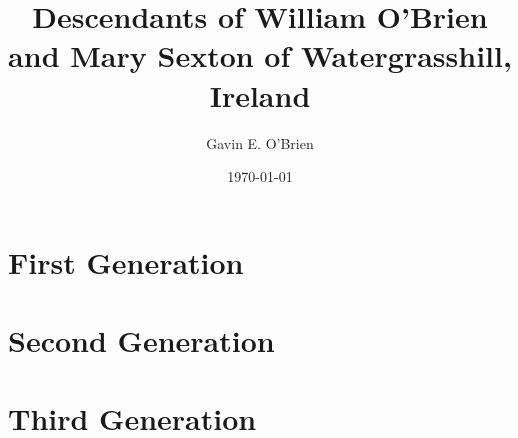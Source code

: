 \documentclass[oneside,letterpaper,12pt]{memoir}
\begin{document}
\author{Gavin E. O'Brien}
\title{Descendants of William O'Brien and Mary Sexton of Watergrasshill, Ireland}
\date{\today}

\maketitle
\tableofcontents




\chapter{First Generation}

\chapter{Second Generation}





\chapter{Third Generation}










\end{document}
